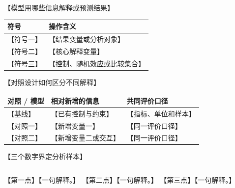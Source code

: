 \documentclass[aspectratio=169,11pt,fontset=fandol]{ctexbeamer}
\begin{document}
\begin{frame}{【模型用哪些信息解释或预测结果】}
  \vspace{.5em}
  \centering
  \par
  \vspace{.7em}
  {\small
  \begin{tabular}{@{}l p{8.8cm}@{}}
    \toprule
    符号 & 操作含义 \\
    \midrule
    【符号一】 & 【结果变量或分析对象】 \\
    【符号二】 & 【核心解释变量】 \\
    【符号三】 & 【控制、随机效应或比较集合】 \\
    \bottomrule
  \end{tabular}}
\end{frame}

\begin{frame}{【对照设计如何区分不同解释】}
  \setlength{\tabcolsep}{3pt}
  \begin{tabular}{@{}p{3.2cm} p{5.2cm} p{4.6cm}@{}}
    \toprule
    对照 / 模型 & 相对新增的信息 & 共同评价口径 \\
    \midrule
    【基线】 & 【已有控制与约束】 & 【指标、单位和样本】 \\
    【对照一】 & 【新增变量一】 & 【同一评价口径】 \\
    【对照二】 & 【新增变量二或交互】 & 【同一评价口径】 \\
    \bottomrule
  \end{tabular}
\end{frame}

\begin{frame}{【三个数字界定分析样本】}
  \vspace{1.4em}
  \begin{columns}[T,onlytextwidth]
      \centering{}
      \centering{}
      \centering{}
      \centering{}
      \centering{}
      \centering{}
  \end{columns}
\end{frame}

  {【第一点】}{【一句解释。】}
  {【第二点】}{【一句解释。】}
  {【第三点】}{【一句解释。】}


\end{document}
